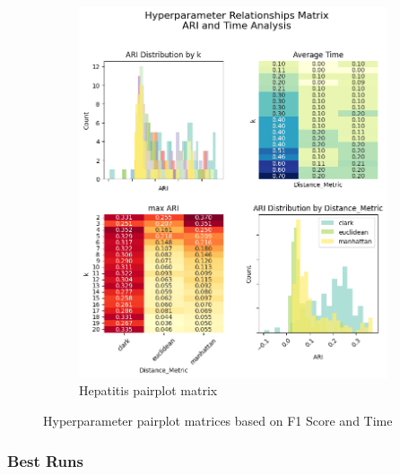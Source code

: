 \begin{figure}[H]
\begin{subfigure}{0.49\textwidth}
        \includegraphics[width=\linewidth]{figures/KMeans/hepatitis_hyperparameter_pairplot_matrix.png}
        \caption{Hepatitis pairplot matrix}
    \end{subfigure}
    \caption{Hyperparameter pairplot matrices based on F1 Score and Time}
    \label{fig:pairplot}
\end{figure}

\subsubsection{Best Runs}

